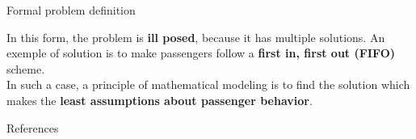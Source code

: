 \documentclass[10pt]{beamer}
\newcommand{\imp}[1]{\textbf{\color{cyan}#1}}
\begin{document}
	
	\begin{frame}{Formal problem definition}
		
		In this form, the problem is \imp{ill posed}, because it has multiple solutions. An exemple of solution is to make passengers follow a \imp{first in, first out (FIFO)} scheme. \\
		\vspace{0.4cm}
		In such a case, a principle of mathematical modeling is to find the solution which makes the \imp{least assumptions about passenger behavior}.
		
	\end{frame}
	
	
	\begin{frame}[allowframebreaks]{References}
		
		
		
		
	\end{frame}
	
\end{document}
